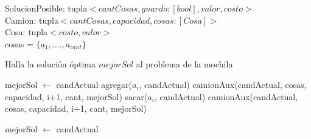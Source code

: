 \noindent
SolucionPosible: tupla$<cantCosas, guardo:[bool], valor, costo>$ \\
Camion: tupla$<cantCosas, capacidad, cosas: [Cosa]>$ \\
Cosa: tupla$<costo, valor>$ \\
cosas = $\{a_1,....,a_{cant}\}$ \\

\begin{algorithm}
\caption{Halla la solución óptima $mejorSol$ al problema de la mochila}
\begin{algorithmic}[1]
        \STATE mejorSol $\leftarrow$ candActual
    \ELSE
                    \STATE agregar($a_i$, candActual)
                    \STATE camionAux(candActual, cosas, capacidad, i+1, cant, mejorSol)
                    \STATE sacar($a_i$, candActual)
                \ENDIF
            \STATE camionAux(candActual, cosas, capacidad, i+1, cant, mejorSol)

                \STATE mejorSol $\leftarrow$ candActual
            \ENDIF
        \ENDIF
    \ENDIF
\end{algorithmic}
\end{algorithm}
